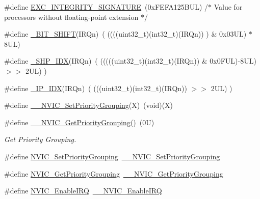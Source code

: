 \begin{DoxyCompactItemize}
\item 
\#define \hyperlink{group___c_m_s_i_s___core___n_v_i_c_functions_ga7d1b21b2d863ccd9e23a3295b3173155}{E\+X\+C\+\_\+\+I\+N\+T\+E\+G\+R\+I\+T\+Y\+\_\+\+S\+I\+G\+N\+A\+T\+U\+RE}~(0x\+F\+E\+F\+A125\+B\+U\+L)     /$\ast$ Value for processors without floating-\/point extension                $\ast$/
\item 
\#define \hyperlink{group___c_m_s_i_s___core___n_v_i_c_functions_ga53c75b28823441c6153269f0ecbed878}{\+\_\+\+B\+I\+T\+\_\+\+S\+H\+I\+FT}(I\+R\+Qn)~(  ((((uint32\+\_\+t)(int32\+\_\+t)(I\+R\+Qn))         )      \&  0x03\+U\+L) $\ast$ 8\+U\+L)
\item 
\#define \hyperlink{group___c_m_s_i_s___core___n_v_i_c_functions_gaee4f7eb5d7e770ad51489dbceabb1755}{\+\_\+\+S\+H\+P\+\_\+\+I\+DX}(I\+R\+Qn)~( (((((uint32\+\_\+t)(int32\+\_\+t)(I\+R\+Qn)) \& 0x0\+F\+U\+L)-\/8\+U\+L) $>$$>$    2\+U\+L)      )
\item 
\#define \hyperlink{group___c_m_s_i_s___core___n_v_i_c_functions_ga370ec4b1751a6a889d849747df3763a9}{\+\_\+\+I\+P\+\_\+\+I\+DX}(I\+R\+Qn)~(   (((uint32\+\_\+t)(int32\+\_\+t)(I\+R\+Qn))                $>$$>$    2\+U\+L)      )
\item 
\#define \hyperlink{group___c_m_s_i_s___core___n_v_i_c_functions_ga6834dd8c9c59394f1b544b57665293a4}{\+\_\+\+\_\+\+N\+V\+I\+C\+\_\+\+Set\+Priority\+Grouping}(X)~(void)(X)
\item 
\#define \hyperlink{group___c_m_s_i_s___core___n_v_i_c_functions_gae1de06155d072758b3453edb07d12459}{\+\_\+\+\_\+\+N\+V\+I\+C\+\_\+\+Get\+Priority\+Grouping}()~(0\+U)
\begin{DoxyCompactList}\small\item\em Get Priority Grouping. \end{DoxyCompactList}\item 
\#define \hyperlink{group___c_m_s_i_s___core___n_v_i_c_functions_ga0e798d5aec68cdd8263db86a76df788f}{N\+V\+I\+C\+\_\+\+Set\+Priority\+Grouping}~\hyperlink{group___c_m_s_i_s___core___n_v_i_c_functions_gafc94dcbaee03e4746ade1f5bb9aaa56d}{\+\_\+\+\_\+\+N\+V\+I\+C\+\_\+\+Set\+Priority\+Grouping}
\item 
\#define \hyperlink{group___c_m_s_i_s___core___n_v_i_c_functions_ga4eeb9214f2264fc23c34ad5de2d3fa11}{N\+V\+I\+C\+\_\+\+Get\+Priority\+Grouping}~\hyperlink{group___c_m_s_i_s___core___n_v_i_c_functions_ga9b894af672df4373eb637f8288845c05}{\+\_\+\+\_\+\+N\+V\+I\+C\+\_\+\+Get\+Priority\+Grouping}
\item 
\#define \hyperlink{group___c_m_s_i_s___core___n_v_i_c_functions_ga57b3064413dbc7459d9646020fdd8bef}{N\+V\+I\+C\+\_\+\+Enable\+I\+RQ}~\hyperlink{group___c_m_s_i_s___core___n_v_i_c_functions_ga71227e1376cde11eda03fcb62f1b33ea}{\+\_\+\+\_\+\+N\+V\+I\+C\+\_\+\+Enable\+I\+RQ}

\end{DoxyCompactItemize}
